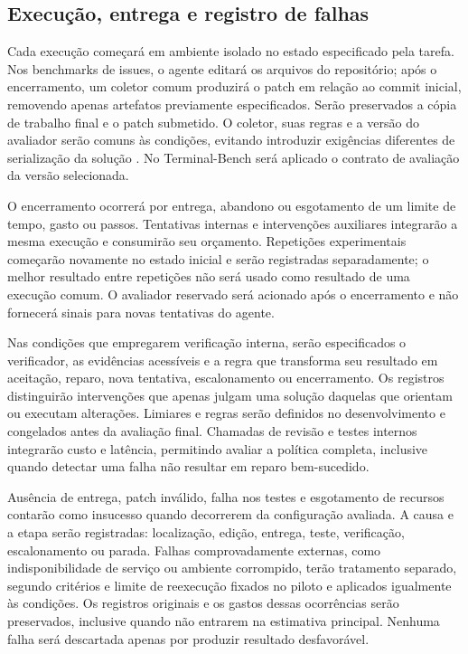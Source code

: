 \subsection{Execução, entrega e registro de falhas}

Cada execução começará em ambiente isolado no estado especificado pela tarefa. Nos benchmarks de issues, o agente editará os arquivos do repositório; após o encerramento, um coletor comum produzirá o patch em relação ao commit inicial, removendo apenas artefatos previamente especificados. Serão preservados a cópia de trabalho final e o patch submetido. O coletor, suas regras e a versão do avaliador serão comuns às condições, evitando introduzir exigências diferentes de serialização da solução \cite{Zheng2026ClawSWEBench}. No Terminal-Bench será aplicado o contrato de avaliação da versão selecionada.

O encerramento ocorrerá por entrega, abandono ou esgotamento de um limite de tempo, gasto ou passos. Tentativas internas e intervenções auxiliares integrarão a mesma execução e consumirão seu orçamento. Repetições experimentais começarão novamente no estado inicial e serão registradas separadamente; o melhor resultado entre repetições não será usado como resultado de uma execução comum. O avaliador reservado será acionado após o encerramento e não fornecerá sinais para novas tentativas do agente.

Nas condições que empregarem verificação interna, serão especificados o verificador, as evidências acessíveis e a regra que transforma seu resultado em aceitação, reparo, nova tentativa, escalonamento ou encerramento. Os registros distinguirão intervenções que apenas julgam uma solução daquelas que orientam ou executam alterações. Limiares e regras serão definidos no desenvolvimento e congelados antes da avaliação final. Chamadas de revisão e testes internos integrarão custo e latência, permitindo avaliar a política completa, inclusive quando detectar uma falha não resultar em reparo bem-sucedido.

Ausência de entrega, patch inválido, falha nos testes e esgotamento de recursos contarão como insucesso quando decorrerem da configuração avaliada. A causa e a etapa serão registradas: localização, edição, entrega, teste, verificação, escalonamento ou parada. Falhas comprovadamente externas, como indisponibilidade de serviço ou ambiente corrompido, terão tratamento separado, segundo critérios e limite de reexecução fixados no piloto e aplicados igualmente às condições. Os registros originais e os gastos dessas ocorrências serão preservados, inclusive quando não entrarem na estimativa principal. Nenhuma falha será descartada apenas por produzir resultado desfavorável.

